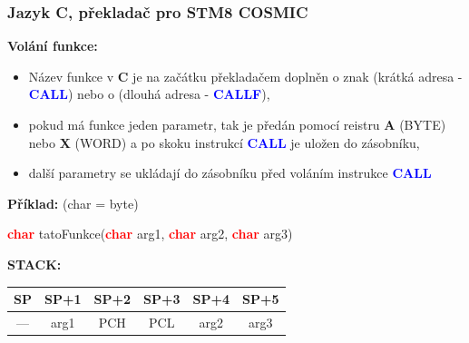 	\begin{frame}
    \frametitle{Jazyk C, překladač pro STM8 \textbf{COSMIC}}
		
		\small
		\textbf{Volání funkce:}
		
		\begin{itemize}
			\item Název funkce v \textbf{C} je na začátku překladačem doplněn o znak \textbf{\uv{\_}} (krátká adresa - \textcolor{blue}{\textbf{CALL}}) nebo o \textbf{} (dlouhá adresa - \textcolor{blue}{\textbf{CALLF}}),
			\item pokud má funkce jeden parametr, tak je předán pomocí reistru \textbf{A} (BYTE) nebo \textbf{X} (WORD) a po skoku instrukcí \textcolor{blue}{\textbf{CALL}} je uložen do zásobníku,
			\item další parametry se ukládají do zásobníku před voláním instrukce \textcolor{blue}{\textbf{CALL}}
		\end{itemize}
		
		\vspace{4mm}
		
		\textbf{Příklad:} (char = byte)
		
		\textcolor{red}{\textbf{char}} tatoFunkce(\textcolor{red}{\textbf{char}} arg1, \textcolor{red}{\textbf{char}} arg2, \textcolor{red}{\textbf{char}} arg3)
		\begin{center}
		\textbf{STACK:}
			\begin{tabular}{| c | c | c | c | c | c |}
				\hline
				\textbf{SP} & \textbf{SP+1} & \textbf{SP+2} & \textbf{SP+3} & \textbf{SP+4} & \textbf{SP+5} \\
				\hline
				--- & arg1 & PCH & PCL & arg2 & arg3 \\
				\hline
			\end{tabular}
		\end{center}

	\end{frame}
	
